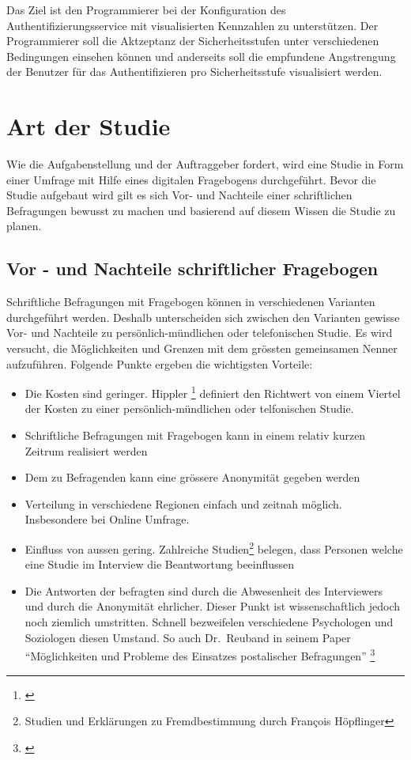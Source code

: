Das Ziel ist den Programmierer bei der Konfiguration des
Authentifizierungsservice mit visualisierten Kennzahlen zu unterstützen.
Der Programmierer soll die Aktzeptanz der Sicherheitsstufen unter
verschiedenen Bedingungen einsehen können und anderseits soll die
empfundene Angstrengung der Benutzer für das Authentifizieren pro
Sicherheitsstufe visualisiert werden.

\section{Art der Studie}\label{art-der-studie}

Wie die Aufgabenstellung und der Auftraggeber fordert, wird eine Studie
in Form einer Umfrage mit Hilfe eines digitalen Fragebogens
durchgeführt. Bevor die Studie aufgebaut wird gilt es sich Vor- und
Nachteile einer schriftlichen Befragungen bewusst zu machen und
basierend auf diesem Wissen die Studie zu planen.

\newpage

\subsection{Vor - und Nachteile schriftlicher
Fragebogen}\label{vor---und-nachteile-schriftlicher-fragebogen}

Schriftliche Befragungen mit Fragebogen können in verschiedenen
Varianten durchgeführt werden. Deshalb unterscheiden sich zwischen den
Varianten gewisse Vor- und Nachteile zu persönlich-mündlichen oder
telefonischen Studie. Es wird versucht, die Möglichkeiten und Grenzen
mit dem grössten gemeinsamen Nenner aufzuführen. Folgende Punkte ergeben
die wichtigsten Vorteile:

\begin{itemize}
\tightlist
\item
  Die Kosten sind geringer. Hippler \footnote{\autocite{hippler}}
  definiert den Richtwert von einem Viertel der Kosten zu einer
  persönlich-mündlichen oder telfonischen Studie.
\item
  Schriftliche Befragungen mit Fragebogen kann in einem relativ kurzen
  Zeitrum realisiert werden
\item
  Dem zu Befragenden kann eine grössere Anonymität gegeben werden
\item
  Verteilung in verschiedene Regionen einfach und zeitnah möglich.
  Insbesondere bei Online Umfrage.
\item
  Einfluss von aussen gering. Zahlreiche Studien\footnote{Studien und
    Erklärungen zu Fremdbestimmung durch François
    Höpflinger\autocite{umfragemethodik}} belegen, dass Personen welche
  eine Studie im Interview die Beantwortung beeinflussen
\item
  Die Antworten der befragten sind durch die Abwesenheit des
  Interviewers und durch die Anonymität ehrlicher. Dieser Punkt ist
  wissenschaftlich jedoch noch ziemlich umstritten. Schnell bezweifelen
  verschiedene Psychologen und Soziologen diesen Umstand. So auch
  Dr.~Reuband in seinem Paper ``Möglichkeiten und Probleme des Einsatzes
  postalischer Befragungen'' \footnote{\autocite{kzfss01}}
\end{itemize}


